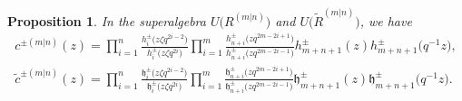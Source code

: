 \documentclass[pdftex]{sigma}
\numberwithin{equation}{section}
\newtheorem{Proposition}[Theorem]{Proposition}
 { \theoremstyle{definition}
\newtheorem{Definition}[Theorem]{Definition}
\newtheorem{Note}[Theorem]{Note}
\newtheorem{Example}[Theorem]{Example}
\newtheorem{Remark}[Theorem]{Remark} }
\begin{document}
\begin{Proposition}\label{pr5}
In the superalgebra $U\bigl(R^{(m|n)}\bigr)$ and $U\bigl(\widetilde{R}^{(m|n)}\bigr)$, we have
\begin{gather*}
c^{\pm(m|n)}(z)=\prod\limits_{i=1}^n\frac{h_i^{\pm}\bigl(z\zeta q^{2i-2}\bigr)}{h_i^{\pm}\bigl(z\zeta q^{2i}\bigr)}\prod\limits_{i=1}^m\frac{h_{n+i}^{\pm}\bigl(z q^{2m-2i+1}\bigr)}{h_{n+i}^{\pm}\bigl(zq^{2m-2i-1}\bigr)}h_{m+n+1}^{\pm}(z)h_{m+n+1}^{\pm}\bigl(q^{-1}z\bigr),\\
\widetilde{c}^{\pm(m|n)}(z)=\prod\limits_{i=1}^n\frac{\mathfrak{h}_i^{\pm}\bigl(z\zeta q^{2i-2}\bigr)}{\mathfrak{h}_i^{\pm}\bigl(z\zeta q^{2i}\bigr)}\prod\limits_{i=1}^m\frac{\mathfrak{h}_{n+i}^{\pm}\bigl(z q^{2m-2i+1}\bigr)}{\mathfrak{h}_{n+i}^{\pm}\bigl(zq^{2m-2i-1}\bigr)}\mathfrak{h}_{m+n+1}^{\pm}(z)\mathfrak{h}_{m+n+1}^{\pm}\bigl(q^{-1}z\bigr).
\end{gather*}
\end{Proposition}
\end{document}

